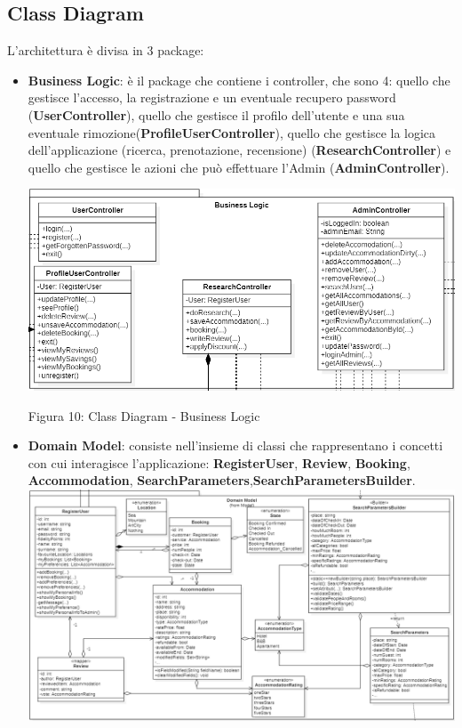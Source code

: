 \documentclass[10pt]{article}
\begin{document}
\subsection{Class Diagram}
L'architettura è divisa in 3 package:
\begin{itemize}
\item \textbf{Business Logic}: è il package che contiene i controller, che sono 4: quello che gestisce l'accesso, la registrazione e un eventuale recupero password (\textbf{UserController}), quello che gestisce il profilo dell'utente e una sua eventuale rimozione(\textbf{ProfileUserController}), quello che gestisce la logica dell'applicazione (ricerca, prenotazione, recensione) (\textbf{ResearchController}) e quello che gestisce le azioni che può effettuare l'Admin (\textbf{AdminController}).  
\par\medskip
\hspace*{-0.75cm}
\includegraphics[scale=0.6]{uml/BusinessLogic}
\begin{center}
Figura 10: Class Diagram - Business Logic 
\end{center}
\item \textbf{Domain Model}: consiste nell’insieme di classi che rappresentano i concetti con cui interagisce l’applicazione: \textbf{RegisterUser}, \textbf{Review}, \textbf{Booking}, \textbf{Accommodation}, \textbf{SearchParameters},\textbf{SearchParametersBuilder}.
\hspace*{-0.5cm}
\includegraphics[scale=0.58]{uml/domainModel}

\end{itemize}
\end{document}
